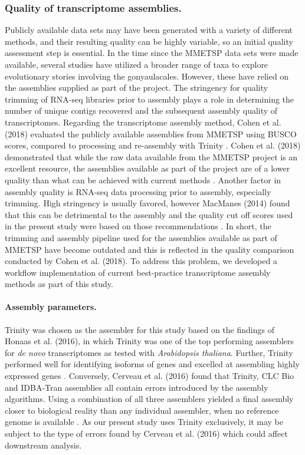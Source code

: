 \documentclass[fleqn,10pt,lineno]{wlpeerj} %
\begin{document}
\subsubsection*{Quality of transcriptome assemblies.}
Publicly available data sets may have been generated with a variety of different methods, and their resulting quality can be highly variable, so an initial quality assessment step is essential. 
In the time since the MMETSP data sets were made available, several studies have utilized a broader range of taxa to explore evolutionary stories involving the gonyaulacales. 
However, these have relied on the assemblies supplied as part of the project. 
The stringency for quality trimming of RNA-seq libraries prior to assembly plays a role in determining the number of unique contigs recovered and the subsequent assembly quality of transcriptomes. 
Regarding the transcriptome assembly method, Cohen et al. (2018) evaluated the publicly available assemblies from MMETSP using BUSCO scores, compared to processing and re-assembly with Trinity \cite{cohen2018mmetsp}. 
Cohen et al. (2018) demonstrated that while the raw data available from the MMETSP project is an excellent resource, the assemblies available as part of the project are of a lower quality than what can be achieved with current methods \cite{cohen2018mmetsp}. 
Another factor in assembly quality is RNA-seq data processing prior to assembly, especially trimming. 
High stringency is usually favored, however MacManes (2014) found that this can be detrimental to the assembly and the quality cut off scores used in the present study were based on those recommendations \cite{macmanes2014optimal}.
In short, the trimming and assembly pipeline used for the assemblies available as part of MMETSP have become outdated and this is reflected in the quality comparison conducted by Cohen et al. (2018).
To address this problem, we developed a workflow implementation of current best-practice transcriptome assembly methods as part of this study.
\paragraph*{Assembly parameters.}
Trinity was chosen as the assembler for this study based on the findings of Honaas et al. (2016), in which Trinity was one of the top performing assemblers for \textit{de novo} transcriptomes as tested with \textit{Arabidopsis thaliana}. 
Further, Trinity performed well for identifying isoforms of genes and excelled at assembling highly expressed genes \cite{honaas2016selecting}.
Conversely, Cerveau et al. (2016) found that Trinity, CLC Bio and IDBA-Tran assemblies all contain errors introduced by the assembly algorithms. 
Using a combination of all three assemblers yielded a final assembly closer to biological reality than any individual assembler, when no reference genome is available \cite{cerveau2016combining}.
As our present study uses Trinity exclusively, it may be subject to the type of errors found by Cerveau et al. (2016) which could affect downstream analysis.
\end{document}
